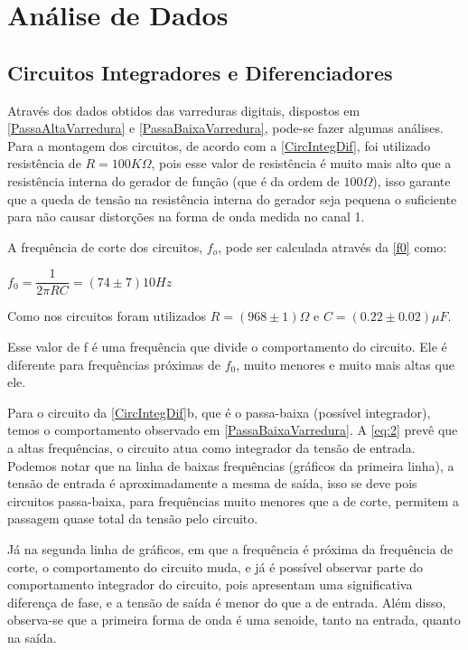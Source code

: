 \documentclass[11pt,a4paper]{article}
\begin{document}
\newpage
\section{Análise de Dados}

    \subsection{Circuitos Integradores e Diferenciadores}

    Através dos dados obtidos das varreduras digitais, dispostos em \cref{PassaAltaVarredura} e \cref{PassaBaixaVarredura}, pode-se fazer algumas análises. Para a montagem dos circuitos, de acordo com a \cref{CircIntegDif}, foi utilizado resistência de $R=100K\Omega$, pois esse valor de resistência é muito mais alto que a resistência interna do gerador de função (que é da ordem de $100\Omega$), isso garante que a queda de tensão na resistência interna do gerador seja pequena o suficiente para não causar distorções na forma de onda medida no canal 1.
    
    A frequência de corte dos circuitos, $f_o$, pode ser calculada através da \cref{f0} como:
    
    $f_{0}=\dfrac{1}{2\pi{RC}}=(74 \pm 7)10Hz$
    
    Como nos circuitos foram utilizados $R=(968\pm 1)\Omega$ e $C=(0.22\pm 0.02)\mu F$.
    
    Esse valor de f é uma frequência que divide o comportamento do circuito. Ele é diferente para frequências próximas de $f_0$, muito menores e muito mais altas que ele.
    
    Para o circuito da \cref{CircIntegDif}b, que é o passa-baixa (possível integrador), temos o comportamento observado em \cref{PassaBaixaVarredura}. A \cref{eq:2} prevê que a altas frequências, o circuito atua como integrador da tensão de entrada. Podemos notar que na linha de baixas frequências (gráficos da primeira linha), a tensão de entrada é aproximadamente a mesma de saída, isso se deve pois circuitos passa-baixa, para frequências muito menores que a de corte, permitem a passagem quase total da tensão pelo circuito. 
    
    Já na segunda linha de gráficos, em que a frequência é próxima da frequência de corte, o comportamento do circuito muda, e já é possível observar parte do comportamento integrador do circuito, pois apresentam uma significativa diferença de fase, e a tensão de saída é menor do que a de entrada. Além disso, observa-se que a primeira forma de onda é uma senoide, tanto na entrada, quanto na saída.
    
\end{document}
